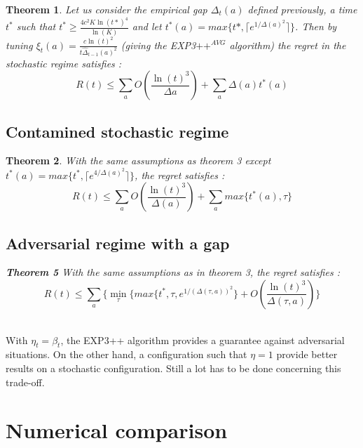 \documentclass[11pt]{article}
\newtheorem{theorem}{Theorem}
\begin{document}
\begin{theorem}
Let us consider the empirical gap $\Delta_{t}(a)$ defined previously, a time $t^{*}$ such that $t^{*}\geq \frac{4c^{2}K\ln(t*)^{4}}{\ln(K)}$ and let $t^{*}(a)=max\{t*,\lceil e^{1/\Delta(a)^{2}}\rceil\}$.
Then by tuning $\xi_{t}(a)=\frac{c\ln(t)^{2}}{t\hat{\Delta}_{t-1}(a)^{2}}$ (giving the EXP3$++^{AVG}$ algorithm) the regret in the stochastic regime satisfies :
$$R(t) \leq \sum_{a}O(\frac{\ln(t)^{3}}{\Delta{a}})+\sum_{a}\Delta(a)t^{*}(a)$$
\end{theorem}

\subsection*{Contamined stochastic regime}

\begin{theorem}
With the same assumptions as theorem 3 except $t^{*}(a)=max\{t^{*}, \lceil e^{4/\Delta(a)^{2}}\rceil \}$, the regret satisfies :
$$R(t) \leq \sum_{a}O(\frac{\ln(t)^{3}}{\Delta(a)})+\sum_{a}max\{t^{*}(a),\tau\}$$
\subsection*{Adversarial regime with a gap}
\textbf{Theorem 5} With the same assumptions as in theorem 3, the regret satisfies :
$$R(t) \leq \sum_{a}\{\min_{\tau}\{max\{t^{*},\tau,e^{1/(\Delta(\tau,a))^{2}}\}+O(\frac{\ln(t)^{3}}{\Delta(\tau,a)})\}$$~\\
\end{theorem}

With $\eta_{t}=\beta_{t}$, the EXP3++ algorithm provides a guarantee against adversarial situations. On the other hand, a configuration such that $\eta=1$ provide better results on a stochastic configuration. Still a lot has to be done concerning this trade-off.

\section*{Numerical comparison}
\end{document}
